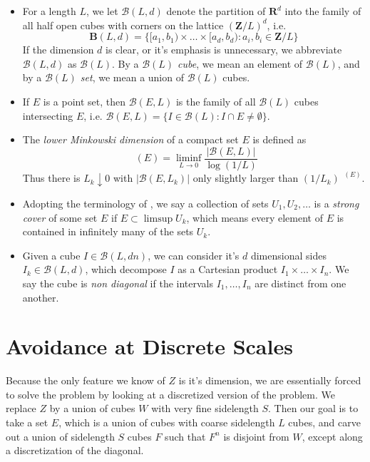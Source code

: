 \documentclass{article}
\theoremstyle{plain}
\theoremstyle{plain}
\DeclareMathOperator{\lhdim}{\underline{\dim}_{\mathbf{M}}}
\begin{document}
\begin{itemize}
	\item For a length $L$, we let $\mathcal{B}(L,d)$ denote the partition of $\mathbf{R}^d$ into the family of all half open cubes with corners on the lattice $(\mathbf{Z}/L)^d$, i.e.
%
\[ \mathbf{B}(L,d) = \{ [a_1,b_1) \times \dots \times [a_d, b_d) : a_i,b_i \in \mathbf{Z}/L \} \]
%
If the dimension $d$ is clear, or it's emphasis is unnecessary, we abbreviate $\mathcal{B}(L,d)$ as $\mathcal{B}(L)$. By a {\it $\mathcal{B}(L)$ cube}, we mean an element of $\mathcal{B}(L)$, and by a {\it $\mathcal{B}(L)$ set}, we mean a union of $\mathcal{B}(L)$ cubes.

\item If $E$ is a point set, then $\mathcal{B}(E,L)$ is the family of all $\mathcal{B}(L)$ cubes intersecting $E$, i.e. $\mathcal{B}(E,L) = \{ I \in \mathcal{B}(L): I \cap E \neq \emptyset \}$.

	\item The {\it lower Minkowski dimension} of a compact set $E$ is defined as
	\[ \lhdim(E) = \liminf_{L \to 0} \frac{|\mathcal{B}(E,L)|}{\log(1/L)} \]
	Thus there is $L_k \downarrow 0$ with $|\mathcal{B}(E,L_k)|$ only slightly larger than $(1/L_k)^{\lhdim(E)}$.

	\item Adopting the terminology of \cite{KatzTao}, we say a collection of sets $U_1, U_2, \dots$ is a {\it strong cover} of some set $E$ if $E \subset \limsup U_k$, which means every element of $E$ is contained in infinitely many of the sets $U_k$.

	\item Given a cube $I \in \mathcal{B}(L, dn)$, we can consider it's $d$ dimensional sides $I_k \in \mathcal{B}(L, d)$, which decompose $I$ as a Cartesian product $I_1 \times \dots \times I_n$. We say the cube is {\it non diagonal} if the intervals $I_1, \dots, I_n$ are distinct from one another.
\end{itemize}

\section{Avoidance at Discrete Scales}

Because the only feature we know of $Z$ is it's dimension, we are essentially forced to solve the problem by looking at a discretized version of the problem. We replace $Z$ by a union of cubes $W$ with very fine sidelength $S$. Then our goal is to take a set $E$, which is a union of cubes with coarse sidelength $L$ cubes, and carve out a union of sidelength $S$ cubes $F$ such that $F^n$ is disjoint from $W$, except along a discretization of the diagonal.
\end{document}
